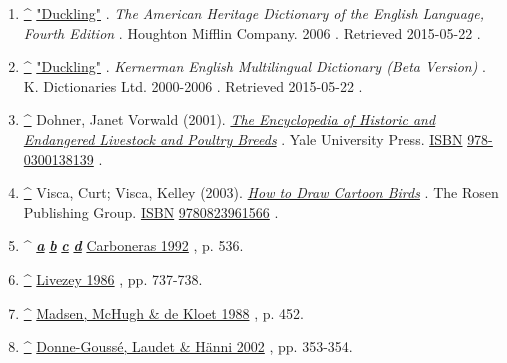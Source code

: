 \documentclass[11pt,a4paper]{article}
\begin{document}
\begin{enumerate}
\item \href{\#cite\_ref-1}{\textbf{\textasciicircum{}}} \href{http://dictionary.reference.com/browse/duckling}{"Duckling"} . \textit{The American Heritage Dictionary of the English Language, Fourth Edition} . Houghton Mifflin Company. 2006 . Retrieved 2015-05-22 .
\item \href{\#cite\_ref-2}{\textbf{\textasciicircum{}}} \href{http://dictionary.reference.com/browse/duckling}{"Duckling"} . \textit{Kernerman English Multilingual Dictionary (Beta Version)} . K. Dictionaries Ltd. 2000-2006 . Retrieved 2015-05-22 .
\item \href{\#cite\_ref-3}{\textbf{\textasciicircum{}}} Dohner, Janet Vorwald (2001). \href{https://books.google.com/books?id=WJCTL\_mC5w4C\&q=male+duck+is+called+a+drake+and+the+female+is+called+a+duck\&pg=PA457}{\textit{The Encyclopedia of Historic and Endangered Livestock and Poultry Breeds}} . Yale University Press. \href{/wiki/ISBN\_(identifier)}{ISBN} \href{/wiki/Special:BookSources/978-0300138139}{978-0300138139} .
\item \href{\#cite\_ref-4}{\textbf{\textasciicircum{}}} Visca, Curt; Visca, Kelley (2003). \href{https://books.google.com/books?id=VqSquCLNrZcC\&q=male+duck+is+called+a+drake+and+the+female+is+called+a+duck+\%28or+hen\%29\&pg=PA16}{\textit{How to Draw Cartoon Birds}} . The Rosen Publishing Group. \href{/wiki/ISBN\_(identifier)}{ISBN} \href{/wiki/Special:BookSources/9780823961566}{9780823961566} .
\item \textasciicircum{} \href{\#cite\_ref-FOOTNOTECarboneras1992536\_5-0}{\textit{\textbf{a}}} \href{\#cite\_ref-FOOTNOTECarboneras1992536\_5-1}{\textit{\textbf{b}}} \href{\#cite\_ref-FOOTNOTECarboneras1992536\_5-2}{\textit{\textbf{c}}} \href{\#cite\_ref-FOOTNOTECarboneras1992536\_5-3}{\textit{\textbf{d}}} \href{\#CITEREFCarboneras1992}{Carboneras 1992} , p. 536.
\item \href{\#cite\_ref-FOOTNOTELivezey1986737–738\_6-0}{\textbf{\textasciicircum{}}} \href{\#CITEREFLivezey1986}{Livezey 1986} , pp. 737-738.
\item \href{\#cite\_ref-FOOTNOTEMadsenMcHughde\_Kloet1988452\_7-0}{\textbf{\textasciicircum{}}} \href{\#CITEREFMadsenMcHughde\_Kloet1988}{Madsen, McHugh \& de Kloet 1988} , p. 452.
\item \href{\#cite\_ref-FOOTNOTEDonne-GousséLaudetHänni2002353–354\_8-0}{\textbf{\textasciicircum{}}} \href{\#CITEREFDonne-GousséLaudetHänni2002}{Donne-Goussé, Laudet \& Hänni 2002} , pp. 353-354.

\end{enumerate}
\end{document}
